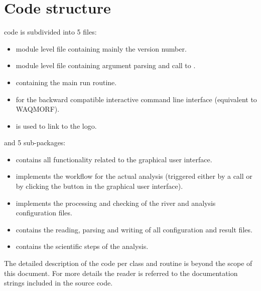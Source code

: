 \chapter{Code structure}


\dfastmi code is subdivided into 5 files:

\begin{itemize}
\item {} module level file containing mainly the version number.
\item {} module level file containing argument parsing and call to .
\item {} containing the main run routine.
\item {} for the backward compatible interactive command line interface (equivalent to WAQMORF).
\item {} is used to link to the \dfastmi logo.
\end{itemize}

and 5 sub-packages:

\begin{itemize}
\item {} contains all functionality related to the graphical user interface.
\item {} implements the workflow for the actual \dfastmi analysis (triggered either by a  call or by clicking the  button in the graphical user interface).
\item {} implements the processing and checking of the river and analysis configuration files.
\item {} contains the reading, parsing and writing of all configuration and result files.
\item {} contains the scientific steps of the analysis.
\end{itemize}

The detailed description of the code per class and routine is beyond the scope of this document.
For more details the reader is referred to the documentation strings included in the source code.
